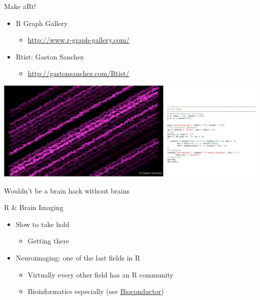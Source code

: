\documentclass[ignorenonframetext,]{beamer}
\providecommand{\tightlist}{%
  \setlength{\itemsep}{0pt}\setlength{\parskip}{0pt}}
\begin{document}
\begin{frame}{Make aRt!}
\protect\hypertarget{make-art}{}

\begin{itemize}
\tightlist
\item
  R Graph Gallery

  \begin{itemize}
  \tightlist
  \item
    \url{http://www.r-graph-gallery.com/}
  \end{itemize}
\item
  Rtist: Gaston Sanchez

  \begin{itemize}
  \tightlist
  \item
    \url{http://gastonsanchez.com/Rtist/}
  \end{itemize}
\end{itemize}

\includegraphics{../external/images/funR_5_aRt_pink_combo.png}

\end{frame}

\begin{frame}{Wouldn't be a brain hack without brains}
\protect\hypertarget{wouldnt-be-a-brain-hack-without-brains}{}

\end{frame}

\begin{frame}{R \& Brain Imaging}
\protect\hypertarget{r-brain-imaging}{}

\begin{itemize}
\tightlist
\item
  Slow to take hold

  \begin{itemize}
  \tightlist
  \item
    Getting there
  \end{itemize}
\item
  Neuroimaging: one of the last fields in R

  \begin{itemize}
  \tightlist
  \item
    Virtually every other field has an R community
  \item
    Bioinformatics especially (see
    \href{https://www.bioconductor.org/}{Bioconductor})
  \end{itemize}
\end{itemize}

\end{frame}
\end{document}
